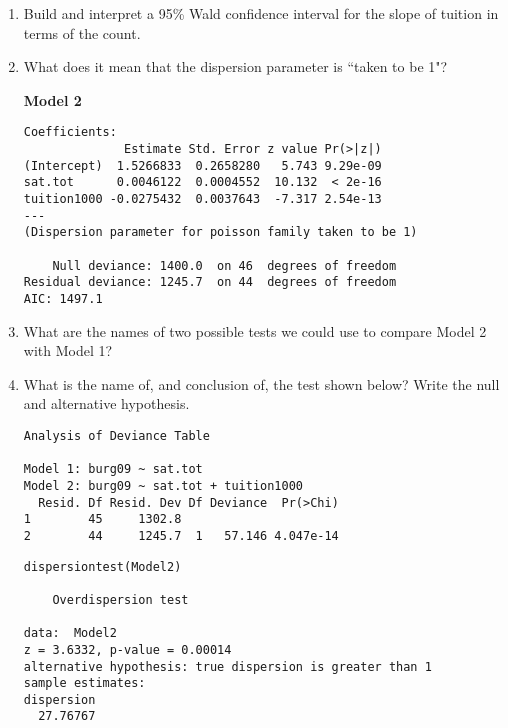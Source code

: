 \documentclass[11pt]{article}
\begin{document}
\begin{enumerate}
\item Build and interpret a 95\% Wald confidence interval for the slope of tuition in terms of the count. 

\vspace{5cm}



\item What does it mean that the dispersion parameter is ``taken to be 1"?


\pagebreak


\textbf{Model 2} 
\begin{verbatim}
Coefficients:
              Estimate Std. Error z value Pr(>|z|)    
(Intercept)  1.5266833  0.2658280   5.743 9.29e-09 
sat.tot      0.0046122  0.0004552  10.132  < 2e-16 
tuition1000 -0.0275432  0.0037643  -7.317 2.54e-13 
---
(Dispersion parameter for poisson family taken to be 1)

    Null deviance: 1400.0  on 46  degrees of freedom
Residual deviance: 1245.7  on 44  degrees of freedom
AIC: 1497.1
\end{verbatim}

\item What are the names of two possible tests we could use to compare Model 2 with Model 1? 


\vspace{5cm} 

\item What is the name of, and conclusion of, the test shown below? Write the null and alternative hypothesis. 

\begin{verbatim}
Analysis of Deviance Table

Model 1: burg09 ~ sat.tot
Model 2: burg09 ~ sat.tot + tuition1000
  Resid. Df Resid. Dev Df Deviance  Pr(>Chi)    
1        45     1302.8                          
2        44     1245.7  1   57.146 4.047e-14 
\end{verbatim}

\pagebreak


\begin{verbatim}
dispersiontest(Model2)

	Overdispersion test

data:  Model2
z = 3.6332, p-value = 0.00014
alternative hypothesis: true dispersion is greater than 1
sample estimates:
dispersion 
  27.76767 
\end{verbatim}


\end{enumerate}
\end{document}
